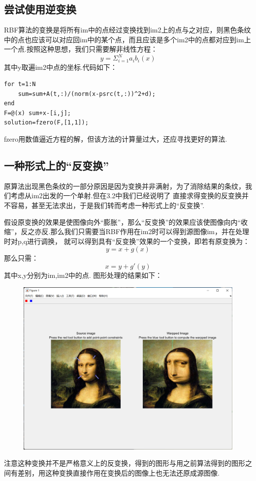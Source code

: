 \documentclass[12pt]{article}
\begin{document}
\subsection{尝试使用逆变换}
RBF算法的变换是将所有im中的点经过变换找到im2上的点与之对应，则黑色条纹中的点也应该可以对应回im中的某个点，而且应该是多个im2中的点都对应到im上一个点.按照这种思想，我们只需要解非线性方程：
\begin{equation}
    y=\Sigma _{i=1}^N a_i b_i(x)
\end{equation}
其中y取遍im2中点的坐标.代码如下：
\begin{lstlisting}
for t=1:N
    sum=sum+A(t,:)/(norm(x-psrc(t,:))^2+d);
end
F=@(x) sum+x-[i,j];
solution=fzero(F,[1,1]);
\end{lstlisting}
fzero用数值逼近方程的解，但该方法的计算量过大，还应寻找更好的算法.

\subsection{一种形式上的“反变换”}
原算法出现黑色条纹的一部分原因是因为变换并非满射，为了消除结果的条纹，我们考虑从im2出发的一个单射.但在3.2中我们已经说明了
直接求得变换的反变换并不容易，甚至无法求出，于是我们转而考虑一种形式上的“反变换”.

假设原变换的效果是使图像向外“膨胀”，那么“反变换”的效果应该使图像向内“收缩”，反之亦反.那么我们只需要当RBF作用在im2时可以得到源图像im，并在处理时对p,q进行调换，
就可以得到具有“反变换”效果的一个变换，即若有原变换为：
\begin{equation}
    y=x+g(x)
\end{equation}
那么只需：
\begin{equation}
    x=y+g'(y)
\end{equation}
其中x,y分别为im,im2中的点.
图形处理的结果如下：
\begin{figure}[H]
    \centering
    \includegraphics[scale=0.4]{pic4.png}
\end{figure}
注意这种变换并不是严格意义上的反变换，得到的图形与用之前算法得到的图形之间有差别，用这种变换直接作用在变换后的图像上也无法还原成源图像.
\end{document}
